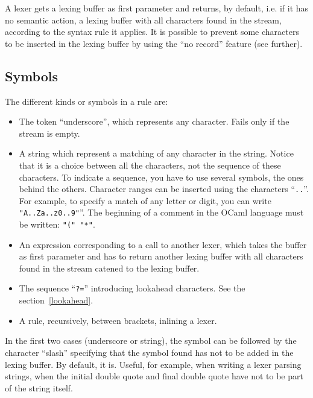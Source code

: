 \documentclass[11pt]{article}
\begin{document}
A lexer gets a lexing buffer as first parameter and returns, by
default, i.e. if it has no semantic action, a lexing buffer with all
characters found in the stream, according to the syntax rule it
applies. It is possible to prevent some characters to be inserted in
the lexing buffer by using the ``no record'' feature (see
further).

\subsection{Symbols}

The different kinds or symbols in a rule are:

\begin{itemize}

\item The token ``underscore'', which represents any
  character. Fails only if the stream is empty.

\item A string which represent a matching of any character in the
  string. Notice that it is a choice between all the characters, not
  the sequence of these characters. To indicate a sequence, you have
  to use several symbols, the ones behind the others. Character ranges
  can be inserted using the characters ``\verb/../''. For example, to
  specify a match of any letter or digit, you can write
  \verb/"A..Za..z0..9"/''. The beginning of a comment in the OCaml
  language must be written: \verb/"(" "*"/.

\item An expression corresponding to a call to another lexer, which
  takes the buffer as first parameter and has to return another lexing
  buffer with all characters found in the stream catened to the lexing
  buffer.

\item The sequence ``\verb/?=/'' introducing lookahead characters.
  See the section~\ref{lookahead}.

\item A rule, recursively, between brackets, inlining a lexer.

\end{itemize}

In the first two cases (underscore or string), the symbol can be
followed by the character ``slash'' specifying that the symbol found
has not to be added in the lexing buffer. By default, it is. Useful,
for example, when writing a lexer parsing strings, when the initial
double quote and final double quote have not to be part of the string
itself.
\end{document}
